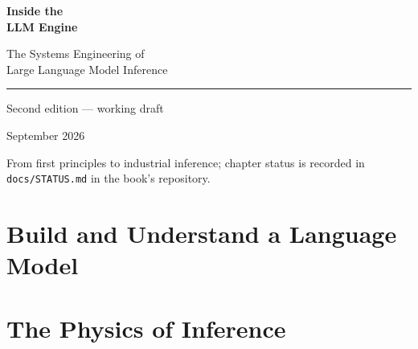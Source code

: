 \documentclass[11pt,oneside,openany]{book}
\begin{document}
\frontmatter
\begin{titlepage}
\color{BookBlue}\sffamily
\vspace*{24mm}
{\fontsize{38}{44}\selectfont\bfseries Inside the\\LLM Engine\par}
\vspace{12mm}
{\Large The Systems Engineering of\\Large Language Model Inference\par}
\vspace{14mm}\rule{\linewidth}{.8pt}\par
\vspace{7mm}{\large Build the model. Understand the machine.\\Engineer the service.\par}
\vfill
{\large Second edition --- working draft\par}
\vspace{5mm}September 2026\par
From first principles to industrial inference; chapter status is recorded in\\
\texttt{docs/STATUS.md} in the book's repository.
\end{titlepage}

\clearpage
\tableofcontents
\mainmatter
\part{Build and Understand a Language Model}\label{part:foundations}\label{app:transformer}


















\part{The Physics of Inference}\label{part:physics}






\end{document}
